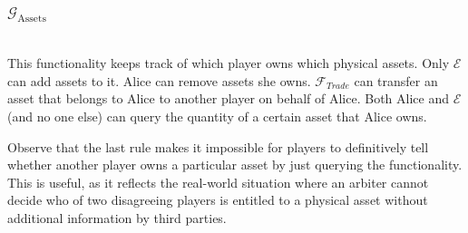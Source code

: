 \subsubsection{$\mathcal{G}_{\mathrm{Assets}}$} \ \\[0.5\baselineskip]
  This functionality keeps track of which player owns which physical assets. Only
  $\mathcal{E}$ can add assets to it. Alice can remove assets she owns.
  $\mathcal{F}_{Trade}$ can transfer an asset that belongs to Alice to another player on
  behalf of Alice.  Both Alice and $\mathcal{E}$ (and no one else) can query the quantity
  of a certain asset that Alice owns.

  Observe that the last rule makes it impossible for players to definitively tell whether
  another player owns a particular asset by just querying the functionality. This is
  useful, as it reflects the real-world situation where an arbiter cannot decide who of
  two disagreeing players is entitled to a physical asset without additional information
  by third parties.
